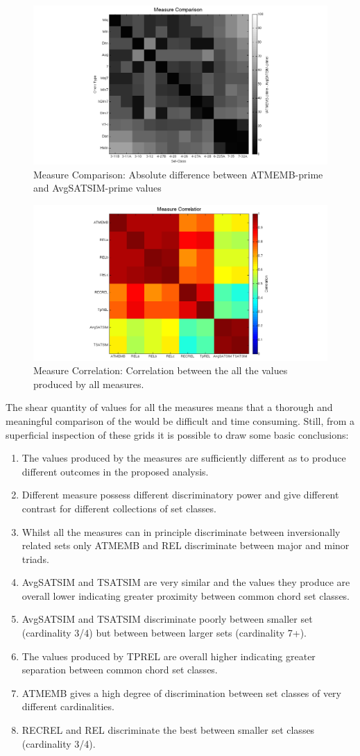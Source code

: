 \documentclass{article}
\begin{document}
\begin{figure}[htb]
 \centering
 \includegraphics[width=.6\linewidth]{./plots/measurecomp.png}
 \caption{\label{fig:measurecomp}Measure Comparison: Absolute difference between ATMEMB-prime and AvgSATSIM-prime values}
 \end{figure} 
\begin{figure}[htb]
\centering
\includegraphics[width=.6\linewidth]{./plots/corr.png}
\caption{\label{fig:corr}Measure Correlation: Correlation between the all the values produced by all measures.}
\end{figure}

The shear quantity of values for all the measures means that a
thorough and meaningful comparison of the would be difficult and time
consuming. Still, from a superficial inspection of these grids it is
possible to draw some basic conclusions:

\begin{enumerate}
\item The values produced by the measures are sufficiently different as to
   produce different outcomes in the proposed analysis.
\item Different measure possess different discriminatory power and give
   different contrast for different collections of set classes.
\item Whilst all the measures can in principle discriminate between
   inversionally related sets only ATMEMB and REL discriminate between
   major and minor triads.
\item AvgSATSIM and TSATSIM are very similar and the values they produce
   are overall lower indicating greater proximity between common chord
   set classes.
\item AvgSATSIM and TSATSIM discriminate poorly between smaller set
   (cardinality 3/4) but between between larger sets (cardinality 7+).
\item The values produced by TPREL are overall higher indicating greater
   separation between common chord set classes.
\item ATMEMB gives a high degree of discrimination between set classes of
   very different cardinalities.
\item RECREL and REL discriminate the best between smaller set classes
   (cardinality 3/4).
\end{enumerate}
\end{document}
